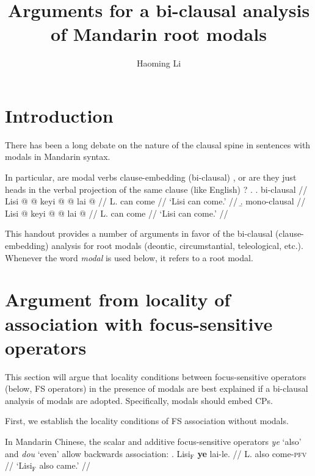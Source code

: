 \documentclass[11pt]{article}
\title{Arguments for a bi-clausal analysis of Mandarin root modals}
\author{Haoming Li}
\let\latextextsubscript\textsubscript
\let\textsubscript\latextextsubscript
\newcommand{\gap}[1]{\rule{1em}{0.4pt}\textsubscript{#1}}
\newcommand{\F}{\ensuremath{_{\mathrm{F}}}}
\begin{document}
\maketitle
\section{Introduction}
\label{sec:introduction}

There has been a long debate on the nature of the clausal spine in sentences with modals in Mandarin syntax.

In particular, are modal verbs clause-embedding (bi-clausal) \citep{panArchitecturePeripheryChinese2019,linFinitenessClausesRaising2011,linMultiplemodalConstructionsMandarin2012}, or are they just heads in the verbal projection of the same clause (like English) \citep{yipGeneralizedScopeEconomy2020,leeMovementQuantificationalHeads2021,erlewineLowSentencefinalParticles2017}?
\ex.
\a. \begingl
\glpreamble bi-clausal //
\gla Lisi \nogloss{\I{[}VP {} } @  \nogloss{\I{[}V {} } @ keyi @ \nogloss{]} \nogloss{\I{[}TP/CP {} } @ \nogloss{\gap{}} lai @ \nogloss{]]} //
  \glb L. can come //
  \glft `Lisi can come.' //
\endgl
\b. \begingl
\glpreamble mono-clausal //
\gla Lisi \nogloss{\I{[}F/ModP \I{[}F/Mod {} } @ keyi @ \nogloss{]} \nogloss{\I{[}\emph{v}P {} } @ \nogloss{\gap{}} lai @ \nogloss{]]} //
  \glb L. can come //
  \glft `Lisi can come.' //
\endgl

This handout provides a number of arguments in favor of the bi-clausal (clause-embedding) analysis for root modals (deontic, circumstantial, teleological, etc.).
Whenever the word \emph{modal} is used below, it refers to a root modal.

\section{Argument from locality of association with focus-sensitive operators}
\label{sec:argument_from_locality_of_association_with_focus_sensitive_operators}
This section will argue that locality conditions between focus-sensitive operators (below, FS operators) in the presence of modals are best explained if a bi-clausal analysis of modals are adopted.
Specifically, modals should embed CPs.

First, we establish the locality conditions of FS association without modals.

In Mandarin Chinese, the scalar and additive focus-sensitive operators  \emph{ye} `also' and \emph{dou} `even' allow backwards association:
\ex. \begingl
\gla Lisi\F{} \textbf{ye} lai-le. //
  \glb L. also come-\textsc{pfv} //
  \glft `Lisi\F{} also came.' //
\endgl
\end{document}
